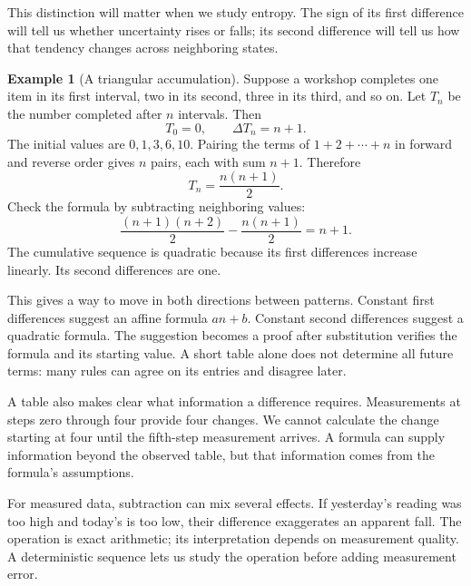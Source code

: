 \documentclass[11pt,oneside,openany]{book}
\theoremstyle{definition}
\newtheorem{example}{Example}[chapter]
\theoremstyle{remark}
\numberwithin{equation}{chapter}
\begin{document}
This distinction will matter when we study entropy. The sign of its first difference will tell us whether uncertainty rises or falls; its second difference will tell us how that tendency changes across neighboring states.

\begin{example}[A triangular accumulation]

Suppose a workshop completes one item in its first interval, two in its second, three in its third, and so on. Let \(T_n\) be the number completed after \(n\) intervals. Then \[T_0=0,\qquad \Delta T_n=n+1.\] The initial values are \(0,1,3,6,10\). Pairing the terms of \(1+2+\cdots+n\) in forward and reverse order gives \(n\) pairs, each with sum \(n+1\). Therefore \[T_n=\frac{n(n+1)}2.\] Check the formula by subtracting neighboring values: \[\frac{(n+1)(n+2)}2-\frac{n(n+1)}2=n+1.\] The cumulative sequence is quadratic because its first differences increase linearly. Its second differences are one.

\end{example}

This gives a way to move in both directions between patterns. Constant first differences suggest an affine formula \(an+b\). Constant second differences suggest a quadratic formula. The suggestion becomes a proof after substitution verifies the formula and its starting value. A short table alone does not determine all future terms: many rules can agree on its entries and disagree later.

A table also makes clear what information a difference requires. Measurements at steps zero through four provide four changes. We cannot calculate the change starting at four until the fifth-step measurement arrives. A formula can supply information beyond the observed table, but that information comes from the formula's assumptions.

For measured data, subtraction can mix several effects. If yesterday's reading was too high and today's is too low, their difference exaggerates an apparent fall. The operation is exact arithmetic; its interpretation depends on measurement quality. A deterministic sequence lets us study the operation before adding measurement error.
\end{document}
